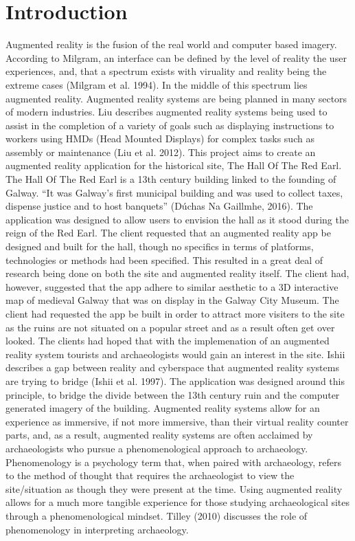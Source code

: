 \chapter{Introduction}
Augmented reality is the fusion of the real world and computer based imagery. According to Milgram, an interface can be defined by the level of reality the user experiences, and, that a spectrum exists with viruality and reality being the extreme cases (Milgram et al. 1994).
In the middle of this spectrum lies augmented reality. Augmented reality systems are being planned in many sectors of modern industries. Liu describes augmented reality systems being used to assist in the completion of a variety of goals such as displaying instructions to workers using HMDs (Head Mounted Displays) for complex tasks such as assembly or maintenance (Liu et al. 2012).
This project aims to create an augmented reality application for the historical site, The Hall Of The Red Earl.
The Hall Of The Red Earl is a 13th century building linked to the founding of Galway. “It was Galway’s first municipal building and was used to collect taxes, dispense justice and to host banquets” (Dúchas Na Gaillmhe, 2016). The application was designed to allow users to envision the hall as it stood during the reign of the Red Earl.
The client requested that an augmented reality app be designed and built for the hall, though no specifics in terms of platforms, technologies or methods had been specified. This resulted in a great deal of research being done on both the site and augmented reality itself. The client had, however, suggested that the app adhere to similar aesthetic to a 3D interactive map of medieval Galway that was on display in the Galway City Museum. The client had requested the app be built in order to attract more visiters to the site as the ruins are not situated on a popular street and as a result often get over looked. The clients had hoped that with the implemenation of an augmented reality system tourists and archaeologists would gain an interest in the site.
Ishii describes a gap between reality and cyberspace that augmented reality systems are trying to bridge (Ishii et al. 1997). The application was designed around this principle, to bridge the divide between the 13th century ruin and the computer generated imagery of the building. Augmented reality systems allow for an experience as immersive, if not more immersive, than their virtual reality counter parts, and, as a result, augmented reality systems are often acclaimed by archaeologists who pursue a phenomenological approach to archaeology. Phenomenology is a psychology term that, when paired with archaeology, refers to the method of thought that requires the archaeologist to view the site/situation as though they were present at the time. Using augmented reality allows for a much more tangible experience for those studying archaeological sites through a phenomenological mindset. Tilley (2010) discusses the role of phenomenology in interpreting archaeology.

